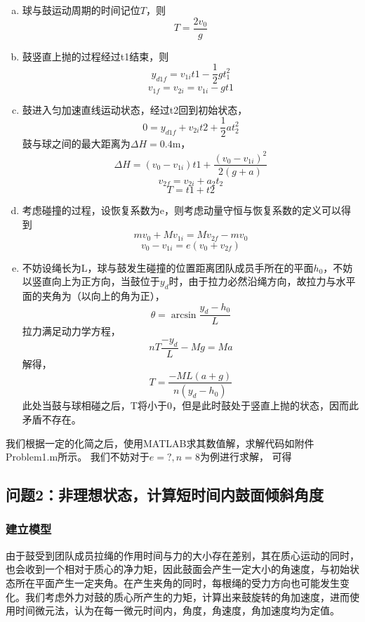 \documentclass[nocover]{cumcmart}%
\begin{document}
\begin{enumerate}[(a)]
\item
球与鼓运动周期的时间记位$T$，则
$$T = \frac{2v_0}{g}$$
    \item
    鼓竖直上抛的过程经过t1结束，则
    $$y_{d1f} = v_{1i}t1 - \frac{1}{2}g t_1^2$$
    $$v_{1f} = v_{2i} = v_{1i}-gt1$$
    \item
    鼓进入匀加速直线运动状态，经过t2回到初始状态，
    $$0 = y_{d1f} + v_{2i}t2 + \frac{1}{2}a t_2^2$$
    鼓与球之间的最大距离为$\Delta H = 0.4$m，
    $$\Delta H = (v_0 - v_{1i})t1 + \frac{(v_0 -v_{1i})^2}{2(g+a)}$$
    $$v_{2f} = v_{2i} + a_2 t_2$$
    $$T = t1 + t2$$
    \item
    考虑碰撞的过程，设恢复系数为e，则考虑动量守恒与恢复系数的定义可以得到
    $$m v_0 + M v_{1i} = M v_{2f} - m v_{0}$$
    $$v_0 - v_{1i} = e(v_0 + v_{2f})$$
    \item
    不妨设绳长为L，球与鼓发生碰撞的位置距离团队成员手所在的平面$h_0$，不妨以竖直向上为正方向，当鼓位于$y_d$时，由于拉力必然沿绳方向，故拉力与水平面的夹角为（以向上的角为正），
    $$\theta = \arcsin{\frac{y_d - h_0}{L}}$$
    拉力满足动力学方程，
    $$n T \frac{-y_d}{L}-Mg = Ma$$
    解得，
    $$T = \frac{-ML(a+g)}{n (y_d - h_0)}$$
    此处当鼓与球相碰之后，T将小于0，但是此时鼓处于竖直上抛的状态，因而此矛盾不存在。
\end{enumerate}

我们根据一定的化简之后，使用MATLAB求其数值解，求解代码如附件Problem1.m所示。
我们不妨对于$e = ?, n = 8$为例进行求解，
可得



\subsection{问题2：非理想状态，计算短时间内鼓面倾斜角度}
\subsubsection{建立模型}
由于鼓受到团队成员拉绳的作用时间与力的大小存在差别，其在质心运动的同时，也会收到一个相对于质心的净力矩，因此鼓面会产生一定大小的角速度，与初始状态所在平面产生一定夹角。在产生夹角的同时，每根绳的受力方向也可能发生变化。我们考虑外力对鼓的质心所产生的力矩，计算出来鼓旋转的角加速度，进而使用时间微元法，认为在每一微元时间内，角度，角速度，角加速度均为定值。
\end{document}
